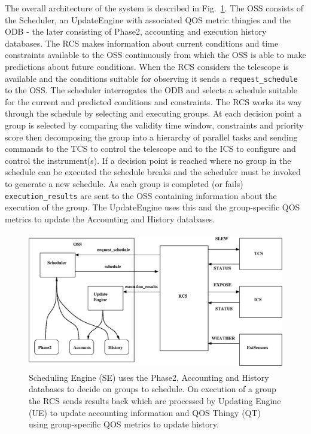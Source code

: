 The overall architecture of the system is described in Fig.~\ref{fig:overview_architecture}. The OSS consists of the Scheduler, an UpdateEngine with associated QOS metric thingies and the ODB - the later consisting of Phase2, accounting and execution history databases. The RCS makes information about current conditions and time constraints available to the OSS continuously from which the OSS is able to make predictions about future conditions. When the RCS considers the telescope is available and the conditions suitable for observing it sends a \texttt{request\_schedule} to the OSS. The scheduler interrogates the ODB and selects a schedule suitable for the current and predicted conditions and constraints. The RCS works its way through the schedule by selecting and executing groups. At each decision point a group is selected by comparing the validity time window, constraints and priority score then decomposing the group into a hierarchy of parallel tasks \cite{fraser02robotic} and sending commands to the TCS to control the telescope and to the ICS to configure and control the instrument(s). If a decision point is reached where no group in the schedule can be executed the schedule breaks and the scheduler must be invoked to generate a new schedule. As each group is completed (or fails) \texttt{execution\_results} are sent to the OSS containing information about the execution of the group. The UpdateEngine uses this and the group-specific QOS metrics to update the Accounting and History databases. 

   \begin{figure}[h]
   \begin{center}
   \includegraphics[height=6cm]{figures/overview_architecture.eps}
   \end{center}
  
   \caption[Overview of Architecture.] 
   {Scheduling Engine (SE) uses the Phase2, Accounting and History databases to decide on groups to schedule. On execution of a group the RCS sends results back which are processed by Updating Engine (UE) to update accounting information and QOS Thingy (QT) using group-specific QOS metrics to update history.}
   \label{fig:overview_architecture} 
   \end{figure} 


